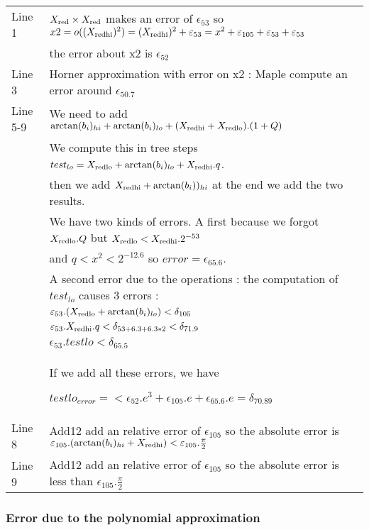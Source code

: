 \begin{tabular}{ll}
Line 1 & $X_{\mathrm{red}} \times X_{\mathrm{red}}$ makes an error of $\epsilon_{53}$ so $x2 =
      o((X_{\mathrm{red hi}})^2) = (X_{\mathrm{red hi}})^2 + \varepsilon_{53} = x^2 + \varepsilon_{105} +
      \varepsilon_{53} + \varepsilon_{53} $\\ 
      &the error about x2 is $\epsilon_{52}$ \\
Line 3 & Horner approximation with error on x2 :
      Maple compute an error around $\epsilon_{50.7}$\\ 
Line 5-9 & We need to add $\arctan(b_i)_{hi}+\arctan(b_i)_{lo} +
      (X_{\mathrm{red hi}}+X_{\mathrm{red lo}}).(1+Q)$\\
      &
      We compute this in tree steps $test_{lo}= X_{\mathrm{red lo}}+ \arctan(b_i)_{lo}
      + X_{\mathrm{red hi}}.q$.\\
      & then we add $X_{\mathrm{red hi}}+\arctan(b_i))_{hi}$ at the end we add the two results.\\

      &We have two kinds of errors. A first because we forgot $X_{\mathrm{red lo}}.Q$
      but $X_{\mathrm{red lo}} < X_{\mathrm{red hi}}.2^{-53}$ \\ &and $q<x^2<2^{-12.6}$ so $error =
      \epsilon_{65.6}$. \\
      & A second error due to the operations : the computation of
      $test_{lo}$ causes 3 errors :\\
      & $ \varepsilon_{53}.(X_{\mathrm{red lo}}+ \arctan(b_i)_{lo}) < \delta_{105}$\\
      & $\varepsilon_{53}.X_{\mathrm{red hi}}.q < \delta_{53+6.3+6.3*2} < \delta_{71.9}$\\
      & $ \epsilon_{53} . testlo < \delta_{65.5}$\\

      &If we add all these errors, we have 

      $testlo_{error} = < \epsilon_{52}.e^3 + \epsilon_{105}.e +
      \epsilon_{65.6}.e = \delta_{70.89}$\\

Line 8 & Add12 add an relative error of $\epsilon_{105}$ so the absolute error is
      $\varepsilon_{105}.(\arctan(b_i)_{hi} + X_{\mathrm{red hi}}) < \varepsilon_{105}.\frac{\pi}{2}$\\
Line 9 & Add12 add an relative error of $\epsilon_{105}$ so the absolute error is 
       less than $\epsilon_{105}.\frac{\pi}{2}$
\end{tabular}
\bigskip

\subsubsection {Error due to the polynomial approximation}

